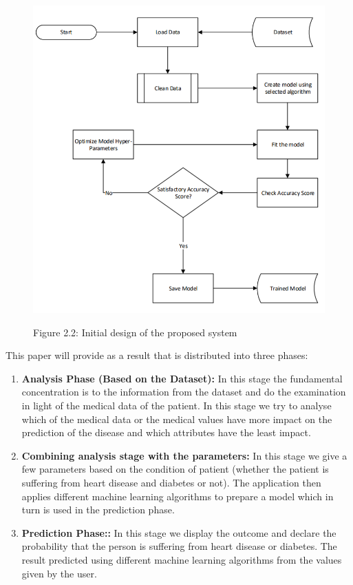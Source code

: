 \documentclass{book}
\begin{document}
    	\begin{figure}
    		\includegraphics[]{images/df.png}
    		
    		\begin{center}
				Figure 2.2: Initial design of the proposed system
    		\end{center}
    	\end{figure}
    	
    	
    	This paper will provide as a result that is distributed into three phases:
    	
    	\begin{enumerate}
    		\item \textbf{Analysis Phase (Based on the Dataset): } In this stage the fundamental concentration is to the information from the dataset and do the examination in light of the medical data of the patient. In this stage we try to analyse which of the medical data or the medical values have more impact on the prediction of the disease and which attributes have the least impact.
    	\item \textbf{Combining analysis stage with the parameters:} In this stage we give a few parameters based on the condition of patient (whether the patient is suffering from heart disease and diabetes or not). The application then applies different machine learning algorithms to prepare a model which in turn is used in the prediction phase.  
    	\item \textbf{Prediction Phase::} In this stage we display the outcome and declare the probability that the person is suffering from heart disease or diabetes. The result predicted using different machine learning algorithms from the values given by the user.
    \end{enumerate}
    	
\end{document}
